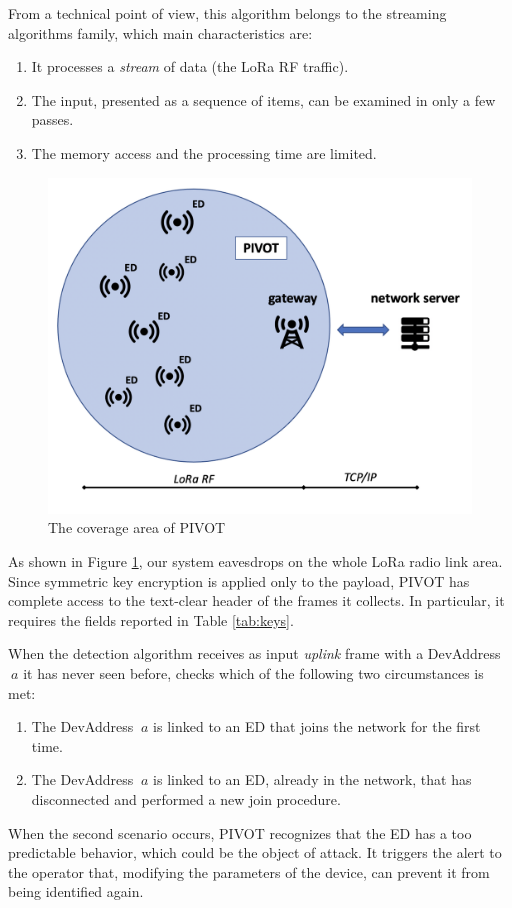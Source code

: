 From a technical point of view, this algorithm belongs to the streaming algorithms family, which main characteristics are:
\begin{enumerate}
	\item It processes a \textit{stream} of data (the LoRa RF traffic).
 	\item The input, presented as a sequence of items, can be examined in only a few passes. 
	\item The memory access and the processing time are limited.
\end{enumerate}
\begin{figure}
    \centering
    \vspace{4ex}%
    \includegraphics[width=0.7\linewidth]{images/pivot/architecture.png}
    \caption{The coverage area of PIVOT}
    \vspace{4ex}%
    \label{fig:coverage}
\end{figure}
As shown in Figure \ref{fig:coverage}, our system eavesdrops on the whole LoRa radio link area. Since symmetric key encryption is applied only to the payload, PIVOT has complete access to the text-clear header of the frames it collects. In particular, it requires the fields reported in Table \ref{tab:keys}.

When the detection algorithm receives as input \textit{uplink} frame with a DevAddress \(\ a \) it has never seen before, checks which of the following two circumstances is met:
\begin{enumerate}
	\item The DevAddress \(\ a \) is linked to an ED that joins the network for the first time.
	\item The DevAddress \(\ a \) is linked to an ED, already in the network, that has disconnected and performed a new join procedure.
\end{enumerate}
When the second scenario occurs, PIVOT recognizes that the ED has a too predictable behavior, which could be the object of attack. It triggers the alert to the operator that, modifying the parameters of the device, can prevent it from being identified again.
\vspace{5mm}

